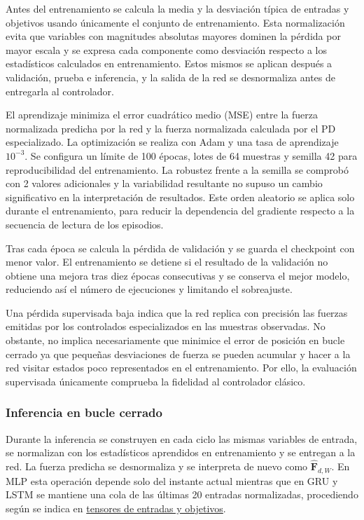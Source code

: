 Antes del entrenamiento se calcula la media y la desviación típica de entradas y
objetivos usando únicamente el conjunto de entrenamiento. Esta normalización evita que
variables con magnitudes absolutas mayores dominen la pérdida por mayor escala y se
expresa cada componente como desviación respecto a los estadísticos calculados en
entrenamiento. Estos mismos se aplican después a validación,
prueba e inferencia, y la salida de la red se desnormaliza antes de entregarla al
controlador.

El aprendizaje minimiza el error cuadrático medio (MSE) entre la fuerza
normalizada predicha por la red y la fuerza normalizada calculada por el PD especializado. La optimización se realiza con Adam \cite{kingma2015adam} y una tasa de
aprendizaje $10^{-3}$. Se configura un límite de 100 épocas, lotes de 64 muestras y
semilla 42 para reproducibilidad del entrenamiento. La robustez frente a la semilla
se comprobó con 2 valores adicionales y la variabilidad resultante no supuso un cambio
significativo en la interpretación de resultados. Este orden aleatorio se aplica solo
durante el entrenamiento, para reducir la dependencia del gradiente respecto a la secuencia
de lectura de los episodios.

Tras cada época se calcula la pérdida de validación y se guarda el checkpoint
con menor valor. El entrenamiento se detiene si el resultado de la validación no
obtiene una mejora tras diez épocas consecutivas y se conserva el mejor modelo,
reduciendo así el número de ejecuciones y limitando el sobreajuste.

Una pérdida supervisada baja indica que la red replica con precisión las fuerzas
emitidas por los controlados especializados en las muestras observadas.
No obstante, no implica necesariamente que minimice el error de posición en bucle
cerrado ya que pequeñas desviaciones de fuerza se pueden acumular y hacer a la red
visitar estados poco representados en el entrenamiento. Por ello, la evaluación
supervisada únicamente comprueba la fidelidad al controlador clásico.

\subsubsection*{Inferencia en bucle cerrado}

Durante la inferencia se construyen en cada ciclo las mismas variables de
entrada, se normalizan con los estadísticos aprendidos en entrenamiento y se
entregan a la red. La fuerza predicha se desnormaliza y se interpreta de nuevo
como $\widehat{\bm{F}}_{d,W}$. En MLP esta operación depende solo del instante
actual mientras que en GRU y LSTM se mantiene una cola de las últimas 20 entradas
normalizadas, procediendo según se indica en \hyperref[subsubsec:tensores-entradas-objetivos]{tensores de entradas y objetivos}.

